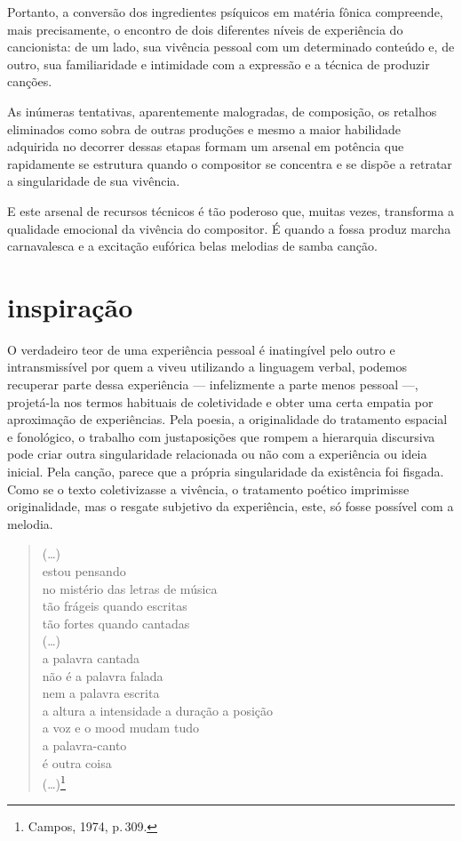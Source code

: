 Portanto, a conversão dos ingredientes psíquicos em matéria fônica
compreende, mais precisamente, o encontro de dois diferentes níveis de
experiência do cancionista: de um lado, sua vivência pessoal com um
determinado conteúdo e, de outro, sua familiaridade e intimidade com a
expressão e a técnica de produzir canções.

As inúmeras tentativas, aparentemente malogradas, de composição, os
retalhos eliminados como sobra de outras produções e mesmo a maior
habilidade adquirida no decorrer dessas etapas formam um arsenal em
potência que rapidamente se estrutura quando o compositor se concentra e
se dispõe a retratar a singularidade de sua vivência.

E este arsenal de recursos técnicos é tão poderoso que, muitas vezes,
transforma a qualidade emocional da vivência do compositor. É quando a
fossa produz marcha carnavalesca e a excitação eufórica belas melodias
de samba canção.

\section{inspiração}

O verdadeiro teor de uma experiência pessoal é inatingível pelo outro e
intransmissível por quem a viveu utilizando a linguagem verbal, podemos
recuperar parte dessa experiência --- infelizmente a parte menos pessoal ---,
projetá-la nos termos habituais de coletividade e obter uma certa empatia
por aproximação de experiências. Pela poesia, a originalidade do
tratamento espacial e fonológico, o trabalho com justaposições que
rompem a hierarquia discursiva pode criar outra singularidade
relacionada ou não com a experiência ou ideia inicial. Pela canção,
parece que a própria singularidade da existência foi fisgada. Como se o
texto coletivizasse a vivência, o tratamento poético imprimisse
originalidade, mas o resgate subjetivo da experiência, este, só fosse
possível com a melodia.

\begin{verse}
\small{(\ldots)\\
estou pensando\\
no mistério das letras de música\\
tão frágeis quando escritas\\
tão fortes quando cantadas\\
(\ldots)\\
a palavra cantada\\
não é a palavra falada\\
nem a palavra escrita\\
a altura a intensidade a duração a posição\\
a voz e o mood mudam tudo\\
a palavra-canto\\
é outra coisa\\
(\ldots)}\footnote{Campos, 1974, p.\,309.}\\
\end{verse}

